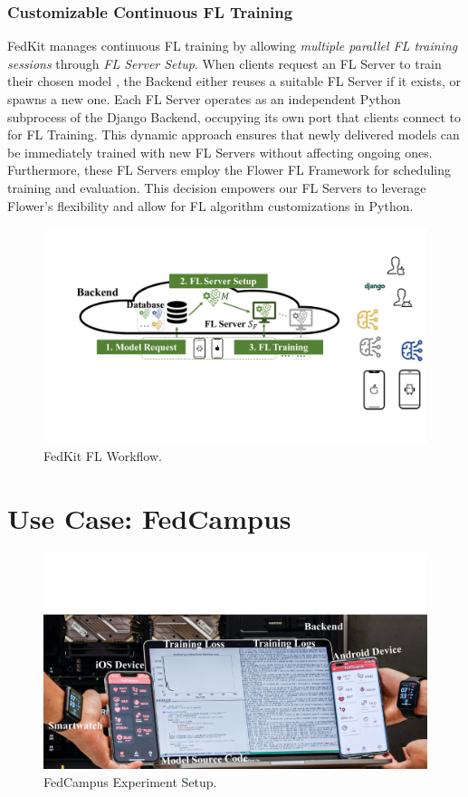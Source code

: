 \documentclass[letterpaper]{article} %
\begin{document}
\subsubsection{Customizable Continuous FL Training}
FedKit manages continuous FL training by allowing \textit{multiple parallel FL training sessions}
through \textit{FL Server Setup}.
When clients request an FL Server to
train their chosen model \model{},
the Backend either reuses a suitable FL Server \fs{} if it exists,
or spawns a new one.
Each FL Server
operates as an independent Python subprocess of the Django Backend,
occupying its own port that
clients connect to for FL Training.
This dynamic approach ensures that
newly delivered models can be immediately trained with new FL Servers
without affecting ongoing ones.
Furthermore,
these FL Servers employ the Flower FL Framework for
scheduling training and evaluation.
This decision empowers our FL Servers to leverage Flower's flexibility and
allow for FL algorithm customizations in Python.

\begin{figure}
    \centering
    \includegraphics*[width=0.9\linewidth]{fl_workflow.pdf}
    \caption{FedKit FL Workflow.}
    \label{fig:fl-workflow}
\end{figure}

\section{Use Case: FedCampus}

\begin{figure}
    \centering
    \includegraphics*[width=0.9\linewidth]{fedcampus.pdf}
    \caption{FedCampus Experiment Setup.}
    \label{fig:fedcampus}
\end{figure}
\end{document}
